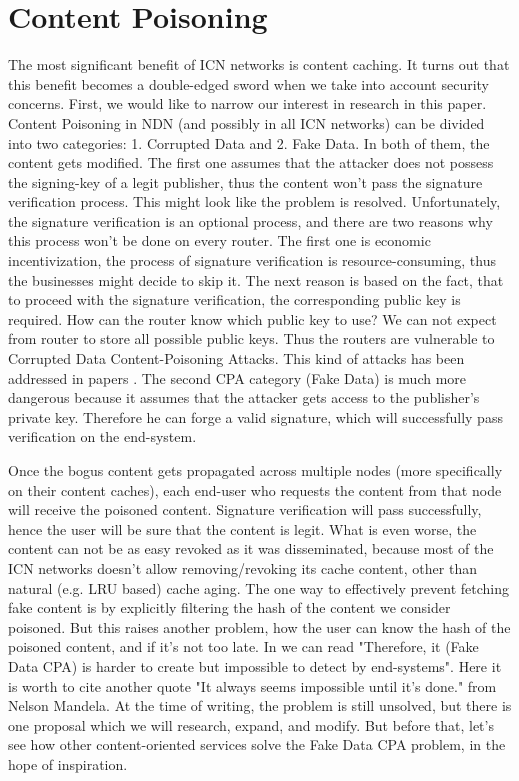 \documentclass[nostrict]{szablonPG}
\begin{document}
\section{Content Poisoning}
The most significant benefit of ICN networks is content caching. It turns out that this benefit becomes a double-edged sword when we take into account security concerns. 
First, we would like to narrow our interest in research in this paper. Content Poisoning in NDN (and possibly in all ICN networks) can be divided into two categories: 1. Corrupted Data and 2. Fake Data. In both of them, the content gets modified. The first one assumes that the attacker does not possess the signing-key of a legit publisher, thus the content won't pass the signature verification process. This might look like the problem is resolved. Unfortunately, the signature verification is an optional process, and there are two reasons why this process won't be done on every router. The first one is economic incentivization, the process of signature verification is resource-consuming, thus the businesses might decide to skip it. The next reason is based on the fact, that to proceed with the signature verification, the corresponding public key is required. How can the router know which public key to use? We can not expect from router to store all possible public keys. Thus the routers are vulnerable to Corrupted Data Content-Poisoning Attacks. This kind of attacks has been addressed in papers \cite{ghali2014needle} \cite{yu2018content} \cite{nguyen2017content}. The second CPA category (Fake Data) is much more dangerous because it assumes that the attacker gets access to the publisher's private key. Therefore he can forge a valid signature, which will successfully pass verification on the end-system. 

Once the bogus content gets propagated across multiple nodes (more specifically on their content caches), each end-user who requests the content from that node will receive the poisoned content. Signature verification will pass successfully, hence the user will be sure that the content is legit. What is even worse, the content can not be as easy revoked as it was disseminated, because most of the ICN networks doesn't allow removing/revoking its cache content, other than natural (e.g. LRU based) cache aging. The one way to effectively prevent fetching fake content is by explicitly filtering the hash of the content we consider poisoned. But this raises another problem, how the user can know the hash of the poisoned content, and if it's not too late. In \cite{nguyen2017content} we can read "Therefore, it (Fake Data CPA) is harder to create but impossible to detect by end-systems". Here it is worth to cite another quote "It always seems impossible until it's done." from Nelson Mandela. At the time of writing, the problem is still unsolved, but there is one proposal \cite{konorski2019mitigating} which we will research, expand, and modify. But before that, let's see how other content-oriented services solve the Fake Data CPA problem, in the hope of inspiration.
\end{document}
